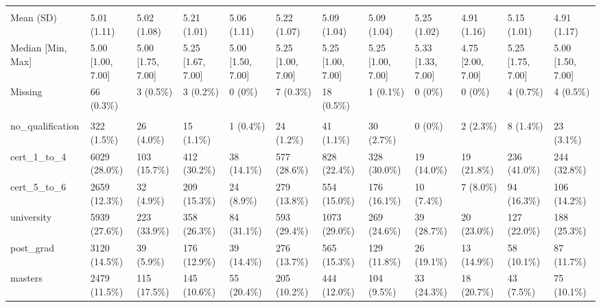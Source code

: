 \documentclass[
  single column]{article}
\begin{document}
\begin{landscape}
\begin{longtable}[t]{llllllllllll}
\addlinespace[0.3em]
\multicolumn{12}{l}{\textbf{Conscientiousness (Personality Trait)}}\\
\hspace{1em}Mean (SD) & 5.01 (1.11) & 5.02 (1.08) & 5.21 (1.01) & 5.06 (1.11) & 5.22 (1.07) & 5.09 (1.04) & 5.09 (1.04) & 5.25 (1.02) & 4.91 (1.16) & 5.15 (1.01) & 4.91 (1.17)\\
\hspace{1em}Median [Min, Max] & 5.00 [1.00, 7.00] & 5.00 [1.75, 7.00] & 5.25 [1.67, 7.00] & 5.00 [1.50, 7.00] & 5.25 [1.00, 7.00] & 5.25 [1.00, 7.00] & 5.25 [1.00, 7.00] & 5.33 [1.33, 7.00] & 4.75 [2.00, 7.00] & 5.25 [1.75, 7.00] & 5.00 [1.50, 7.00]\\
\hspace{1em}Missing & 66 (0.3\%) & 3 (0.5\%) & 3 (0.2\%) & 0 (0\%) & 7 (0.3\%) & 18 (0.5\%) & 1 (0.1\%) & 0 (0\%) & 0 (0\%) & 4 (0.7\%) & 4 (0.5\%)\\
\addlinespace[0.3em]
\multicolumn{12}{l}{\textbf{Education Level}}\\
\hspace{1em}no\_qualification & 322 (1.5\%) & 26 (4.0\%) & 15 (1.1\%) & 1 (0.4\%) & 24 (1.2\%) & 41 (1.1\%) & 30 (2.7\%) & 0 (0\%) & 2 (2.3\%) & 8 (1.4\%) & 23 (3.1\%)\\
\hspace{1em}cert\_1\_to\_4 & 6029 (28.0\%) & 103 (15.7\%) & 412 (30.2\%) & 38 (14.1\%) & 577 (28.6\%) & 828 (22.4\%) & 328 (30.0\%) & 19 (14.0\%) & 19 (21.8\%) & 236 (41.0\%) & 244 (32.8\%)\\
\hspace{1em}cert\_5\_to\_6 & 2659 (12.3\%) & 32 (4.9\%) & 209 (15.3\%) & 24 (8.9\%) & 279 (13.8\%) & 554 (15.0\%) & 176 (16.1\%) & 10 (7.4\%) & 7 (8.0\%) & 94 (16.3\%) & 106 (14.2\%)\\
\hspace{1em}university & 5939 (27.6\%) & 223 (33.9\%) & 358 (26.3\%) & 84 (31.1\%) & 593 (29.4\%) & 1073 (29.0\%) & 269 (24.6\%) & 39 (28.7\%) & 20 (23.0\%) & 127 (22.0\%) & 188 (25.3\%)\\
\hspace{1em}post\_grad & 3120 (14.5\%) & 39 (5.9\%) & 176 (12.9\%) & 39 (14.4\%) & 276 (13.7\%) & 565 (15.3\%) & 129 (11.8\%) & 26 (19.1\%) & 13 (14.9\%) & 58 (10.1\%) & 87 (11.7\%)\\
\hspace{1em}masters & 2479 (11.5\%) & 115 (17.5\%) & 145 (10.6\%) & 55 (20.4\%) & 205 (10.2\%) & 444 (12.0\%) & 104 (9.5\%) & 33 (24.3\%) & 18 (20.7\%) & 43 (7.5\%) & 75 (10.1\%)\\

\end{longtable}
\end{landscape}
\end{document}
